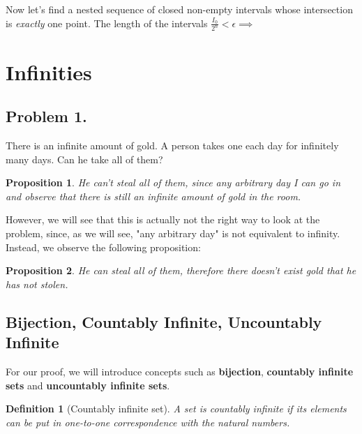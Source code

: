 \documentclass{article}
\newtheorem{proposition}{Proposition}
\newtheorem{definition}{Definition}
\begin{document}
Now let's find a nested sequence of closed non-empty intervals whose intersection is \emph{exactly} one point.
The length of the intervals $\frac{I_0}{2^n} < \epsilon \implies $

\section{Infinities}
\subsection{Problem 1.}
There is an infinite amount of gold. A person takes one each day for infinitely many days. Can he take all of them?

\begin{proposition}
  He can't steal all of them, since any arbitrary day I can go in and observe that there is still an infinite amount of gold in the room.
\end{proposition}
However, we will see that this is actually not the right way to look at the problem, since, as we will see, "any arbitrary day" is not equivalent to infinity. Instead, we observe the following proposition:
\begin{proposition}
    He can steal all of them, therefore there doesn't exist gold that he has not stolen.
\end{proposition}

\subsection{Bijection, Countably Infinite, Uncountably Infinite}

For our proof, we will introduce concepts such as \textbf{bijection}, \textbf{countably infinite sets} and \textbf{uncountably infinite sets}.
\begin{definition}[Countably infinite set]
    A set is countably infinite if its elements can be put in one-to-one correspondence with the natural numbers.
\end{definition}
\end{document}
